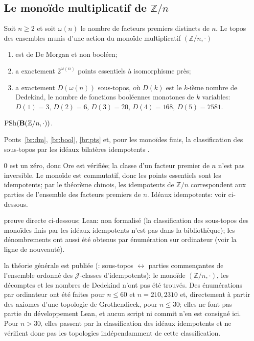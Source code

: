 \subsection{Le monoïde multiplicatif de $\mathbb Z/n$}

\begin{theorem}\label{th:zn}
Soit $n\ge 2$ et soit $\omega(n)$ le nombre de facteurs premiers distincts de $n$. Le topos des ensembles munis d'une action du monoïde multiplicatif $(\mathbb Z/n,\cdot)$
\begin{enumerate}
\item est de De Morgan et non booléen;
\item a exactement $2^{\omega(n)}$ points essentiels à isomorphisme près;
\item a exactement $D(\omega(n))$ sous-topos, où $D(k)$ est le $k$-ième nombre de Dedekind, le nombre de fonctions booléennes monotones de $k$ variables: $D(1) = 3$, $D(2) = 6$, $D(3) = 20$, $D(4) = 168$, $D(5) = 7581$.
\end{enumerate}
\end{theorem}

\begin{trace}
\item[tablier] $\mathrm{PSh}(\mathbf{B}(\mathbb Z/n,\cdot))$.
\item[arche] Ponts~\ref{br:dm}, \ref{br:bool}, \ref{br:pts} et, pour les monoïdes finis, la classification des sous-topos par les idéaux bilatères idempotents \cite[Prop.~6.1.2]{pirashvili-jncg}.
\item[spécialiser] $0$ est un zéro, donc Ore est vérifiée; la classe d'un facteur premier de $n$ n'est pas inversible. Le monoïde est commutatif, donc les points essentiels sont les idempotents; par le théorème chinois, les idempotents de $\mathbb Z/n$ correspondent aux parties de l'ensemble des facteurs premiers de $n$. Idéaux idempotents: voir ci-dessous.
\item[vérifier] preuve directe ci-dessous; Lean: non formalisé (la classification des sous-topos des monoïdes finis par les idéaux idempotents n'est pas dans la bibliothèque); les dénombrements ont aussi été obtenus par énumération sur ordinateur (voir la ligne de nouveauté).
\item[nouveauté] la théorie générale est publiée (\cite[Prop.~6.1.2, Prop.~6.3.1, Th.~5.6.1]{pirashvili-jncg}: sous-topos $\leftrightarrow$ parties commençantes de l'ensemble ordonné des $\mathcal J$-classes d'idempotents); le monoïde $(\mathbb Z/n,\cdot)$, les décomptes et les nombres de Dedekind n'ont pas été trouvés. Des énumérations par ordinateur ont été faites pour $n\le 60$ et $n = 210, 2310$ et, directement à partir des axiomes d'une topologie de Grothendieck, pour $n\le 30$; elles ne font pas partie du développement Lean, et aucun script ni commit n'en est consigné ici. Pour $n>30$, elles passent par la classification des idéaux idempotents \cite{pirashvili-jncg} et ne vérifient donc pas les topologies indépendamment de cette classification.
\end{trace}

